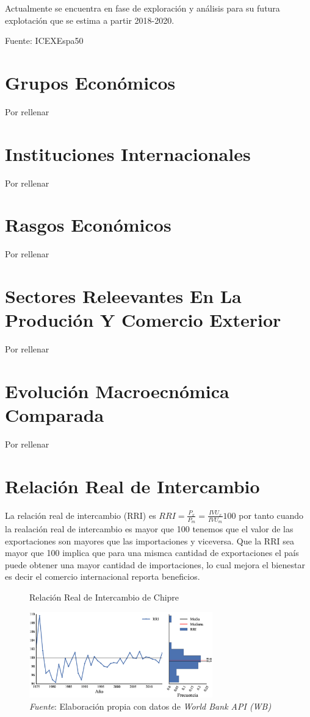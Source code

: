 \documentclass[a4paper,openright,12pt]{book}
\begin{document}
\*Actualmente se encuentra en fase de exploración y análisis para su futura explotación que se estima a partir 2018-2020.

Fuente: ICEXEspa50

\section{Grupos Económicos}
Por rellenar

\section{Instituciones Internacionales}

Por rellenar

\section{Rasgos Económicos}

Por rellenar

\section{Sectores Releevantes En La Produción Y Comercio Exterior}

Por rellenar

\section{Evolución Macroecnómica Comparada}

Por rellenar

\section{Relación Real de Intercambio}

La relación real de intercambio (RRI) es $RRI = \frac{P_x}{P_m} = \frac{IVU_x}{IVU_m} 100$ por tanto cuando la realación real de intercambio es mayor que 100 tenemos que el valor de las exportaciones son mayores que las importaciones y viceversa. Que la RRI sea mayor que 100 implica que para una mismca cantidad de exportaciones el país puede obtener una mayor cantidad de importaciones, lo cual mejora el bienestar es decir el comercio internacional reporta beneficios.

\begin{figure}[!ht]
    \centering
    \caption{Relación Real de Intercambio de Chipre}
    \includegraphics[width=300px]{rri_0.eps}
    \caption*{\textit{Fuente}: Elaboración propia con datos de \textit{World Bank API (WB)}}
    \label{rri}
\end{figure}
\end{document}
